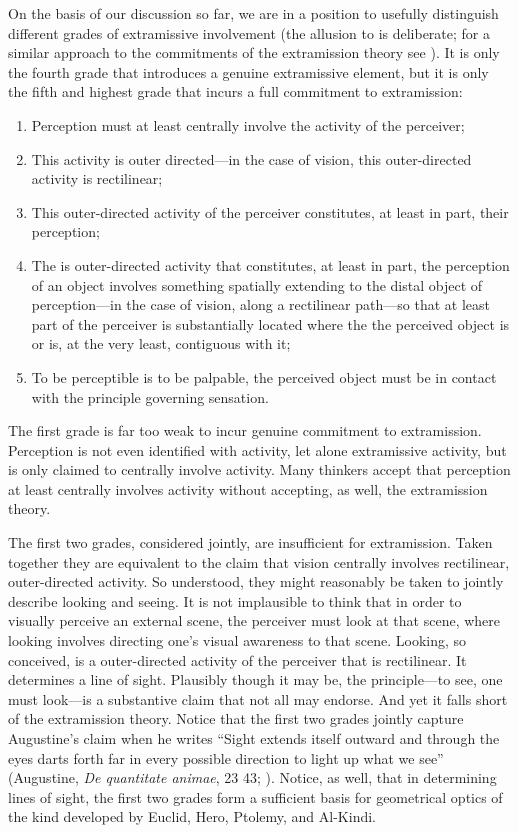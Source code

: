 \documentclass[12pt]{article}
\begin{document}
On the basis of our discussion so far, we are in a position to usefully distinguish different grades of extramissive involvement (the allusion to \citealt{Quine:1953aa} is deliberate; for a similar approach to the commitments of the extramission theory see \citealt{Licka:2020aa}). It is only the fourth grade that introduces a genuine extramissive element, but it is only the fifth and highest grade that incurs a full commitment to extramission:
\begin{enumerate}
	\item Perception must at least centrally involve the activity of the perceiver;
	\item This activity is outer directed---in the case of vision, this outer-directed activity is rectilinear;
	\item This outer-directed activity of the perceiver constitutes, at least in part, their perception;
	\item The is outer-directed activity that constitutes, at least in part, the perception of an object involves something spatially extending to the distal object of perception---in the case of vision, along a rectilinear path---so that at least part of the perceiver is substantially located where the the perceived object is or is, at the very least, contiguous with it;
	\item To be perceptible is to be palpable, the perceived object must be in contact with the principle governing sensation.
\end{enumerate}

The first grade is far too weak to incur genuine commitment to extramission. Perception is not even identified with activity, let alone extramissive activity, but is only claimed to centrally involve activity. Many thinkers accept that perception at least centrally involves activity without accepting, as well, the extramission theory. 

The first two grades, considered jointly, are insufficient for extramission. Taken together they are equivalent to the claim that vision centrally involves rectilinear, outer-directed activity. So understood, they might reasonably be taken to jointly describe looking and seeing. It is not implausible to think that in order to visually perceive an external scene, the perceiver must look at that scene, where looking involves directing one's visual awareness to that scene. Looking, so conceived, is a outer-directed activity of the perceiver that is rectilinear. It determines a line of sight. Plausibly though it may be, the principle---to see, one must look---is a substantive claim that not all may endorse. And yet it falls short of the extramission theory. Notice that the first two grades jointly capture Augustine's claim when he writes ``Sight extends itself outward and through the eyes darts forth far in every possible direction to light up what we see'' (Augustine, \emph{De quantitate animae}, 23 43; \citealt[66]{Colleran:1949ys}). Notice, as well, that in determining lines of sight, the first two grades form a sufficient basis for geometrical optics of the kind developed by Euclid, Hero,  Ptolemy, and Al-Kindi. 
\end{document}
